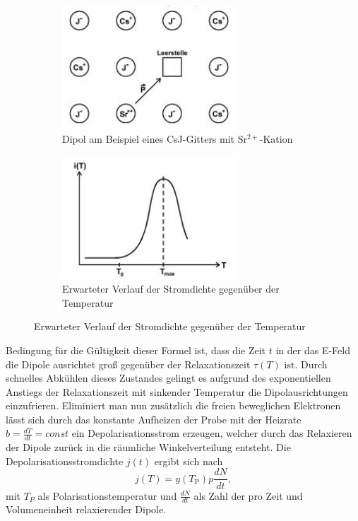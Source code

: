  \begin{figure}[H]
 \centering
 \begin{subfigure}{0.49\textwidth}
 \centering
 \includegraphics[width=6.5cm]{kristall.JPG}
 \caption{Dipol am Beispiel eines CsJ-Gitters mit Sr$^{2+}$-Kation \cite{V48}}
 \label{fig:aufbau}
 \end{subfigure}
 \begin{subfigure}{0.49\textwidth}
 \centering
 \includegraphics[width=6.5cm]{verlauf.JPG}
 \caption{Erwarteter Verlauf der Stromdichte gegenüber der Temperatur \cite{V48}}
 \label{fig:kurv}
 \end{subfigure}
 \end{figure}
 Bedingung für die Gültigkeit dieser Formel ist, dass die Zeit $t$ in der das E-Feld
 die Dipole ausrichtet groß gegenüber der Relaxationszeit $\tau(T)$ ist.
Durch schnelles Abkühlen dieses Zustandes gelingt es aufgrund des exponentiellen Anstiegs
der Relaxationszeit mit sinkender Temperatur die Dipolausrichtungen einzufrieren.
Eliminiert man nun zusätzlich die freien beweglichen Elektronen lässt sich durch das konstante Aufheizen der Probe mit der Heizrate $b=\frac{dT}{dt}=const$
ein Depolarisationsstrom erzeugen, welcher durch das Relaxieren der Dipole zurück in die räumliche Winkelverteilung entsteht.
Die Depolarisationsstromdichte $j(t)$ ergibt sich nach
\begin{equation}
  j(T) = y(T_\text{P}) p \frac{dN}{dt},
\label{eqn:strom}
\end{equation}
 mit $T_{P}$ als Polarisationstemperatur und $\frac{dN}{dt}$ als Zahl der pro Zeit und Volumeneinheit relaxierender Dipole.

